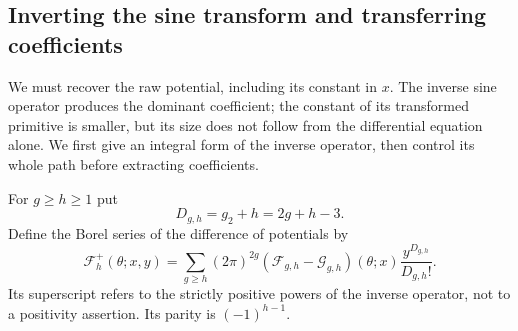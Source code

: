 \subsection{Inverting the sine transform and transferring coefficients}
\label{subsec:s08:04}

We must recover the raw potential, including its constant in $x$.
The inverse sine operator produces the dominant coefficient; the
constant of its transformed primitive is smaller, but its size does
not follow from the differential equation alone. We first give an
integral form of the inverse operator, then control its whole path
before extracting coefficients.

For $g\geq h\geq1$ put
\begin{equation}\label{eq:s08:degree}
 D_{g,h}=g_2+h=2g+h-3.
\end{equation}
Define the Borel series of the difference of potentials by
\begin{equation}\label{eq:s08:inverse-borel-definition}
 \mathcal F_h^+(\theta;x,y)
 =\sum_{g\geq h}(2\pi)^{2g}
   (\mathcal F_{g,h}-\mathcal G_{g,h})(\theta;x)
                       \frac{y^{D_{g,h}}}{D_{g,h}!}.
\end{equation}
Its superscript refers to the strictly positive powers of the inverse
operator, not to a positivity assertion. Its parity is $(-1)^{h-1}$.

